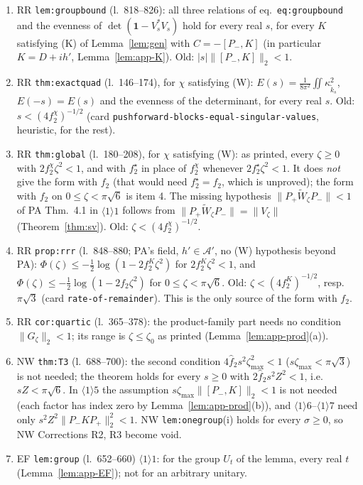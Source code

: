\documentclass[11pt]{article}
\newcommand{\Wt}{\widetilde W}
\newcommand{\kt}{\widetilde k}
\newcommand{\Pp}{P_+}\newcommand{\Pm}{P_-}
\newcommand{\one}{\mathbf 1}
\newcommand{\norm}[1]{\lVert#1\rVert}
\newcommand{\abs}[1]{\lvert#1\rvert}
\begin{document}
\begin{proposition}[Ranges]\label{prop:ranges}
\begin{enumerate}
\item RR \texttt{lem:groupbound} (l.~818--826): all three relations of eq.~\texttt{eq:groupbound} and the evenness of
 $\det(\one-V_s^*V_s)$ hold for every real $s$, for every $K$ satisfying (K) of Lemma~\ref{lem:gen} with
 $C=-[\Pm,K]$ (in particular $K=D+ih'$, Lemma~\ref{lem:app-K}).  Old: $\abs s\norm{[\Pm,K]}_2<1$.
\item RR \texttt{thm:exactquad} (l.~146--174), for $\chi$ satisfying (W): $E(s)=\frac1{8\pi^2}\iint\kappa_{\kt_s}^2$, $E(-s)=E(s)$ and the evenness
 of the determinant, for every real $s$.  Old: $s<(4f_2^\chi)^{-1/2}$ (card \texttt{pushforward-blocks-equal-singular-values},
 heuristic, for the rest).
\item RR \texttt{thm:global} (l.~180--208), for $\chi$ satisfying (W): as printed, every $\zeta\ge0$ with
 $2f_2^\chi\zeta^2<1$, and with $f_2^\star$ in place of $f_2^\chi$ whenever $2f_2^\star\zeta^2<1$.  It does \emph{not}
 give the form with $f_2$ (that would need $f_2^\star=f_2$, which is unproved); the form with $f_2$ on
 $0\le\zeta<\pi\sqrt6$ is item 4.  The missing hypothesis
 $\norm{\Pp\Wt_\zeta\Pm}<1$ of PA Thm.~4.1 in $\langle1\rangle1$ follows from $\norm{\Pp\Wt_\zeta\Pm}=\norm{V_\zeta}$
 (Theorem~\ref{thm:sv}).  Old: $\zeta<(4f_2^\chi)^{-1/2}$.
\item RR \texttt{prop:rrr} (l.~848--880; PA's field, $h'\in\mathcal A'$, no (W) hypothesis beyond PA): $\Phi(\zeta)\le-\frac12\log(1-2f_2^K\zeta^2)$ for $2f_2^K\zeta^2<1$, and
 $\Phi(\zeta)\le-\frac12\log(1-2f_2\zeta^2)$ for $0\le\zeta<\pi\sqrt6$.  Old: $\zeta<(4f_2^K)^{-1/2}$, resp.\ $\pi\sqrt3$ (card \texttt{rate-of-remainder}).  This is the only source of the
 form with $f_2$.
\item RR \texttt{cor:quartic} (l.~365--378): the product-family part needs no condition $\norm{G_\zeta}_2<1$; its range
 is $\zeta\le\zeta_0$ as printed (Lemma~\ref{lem:app-prod}(a)).
\item NW \texttt{thm:T3} (l.~688--700): the second condition $4\hat f_2s^2\zeta_{\max}^2<1$ ($s\zeta_{\max}<\pi\sqrt3$)
 is not needed; the theorem holds for every $s\ge0$ with $2\hat f_2s^2Z^2<1$, i.e.\ $sZ<\pi\sqrt6$.  In
 $\langle1\rangle5$ the assumption $s\zeta_{\max}\norm{[\Pm,K]}_2<1$ is not needed (each factor has index zero by
 Lemma~\ref{lem:app-prod}(b)), and $\langle1\rangle6$--$\langle1\rangle7$ need only $s^2Z^2\norm{\Pm K\Pp}_2^2<1$.
 NW \texttt{lem:onegroup}(i) holds for every $\sigma\ge0$, so NW Corrections R2, R3 become void.
\item EF \texttt{lem:group} (l.~652--660) $\langle1\rangle1$: for the group $U_t$ of the lemma, every real $t$
 (Lemma~\ref{lem:app-EF}); not for an arbitrary unitary.
\end{enumerate}
\end{proposition}
\end{document}
